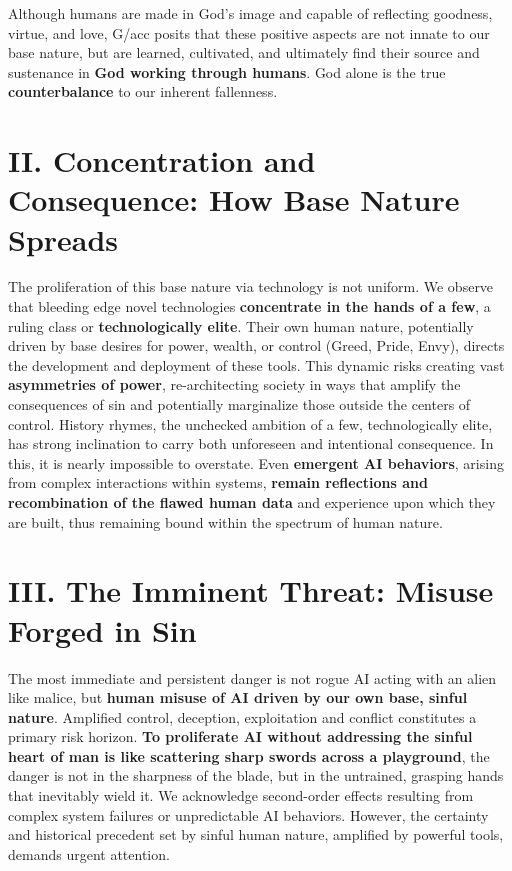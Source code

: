 \documentclass[11pt]{article}
\begin{document}
Although humans are made in God's image and capable of reflecting goodness, virtue, and love, G/acc posits that these positive aspects are not innate to our base nature, but are learned, cultivated, and ultimately find their source and sustenance in \textbf{God working through humans}. God alone is the true\textbf{ counterbalance} to our inherent fallenness.

\section*{II. Concentration and Consequence: How Base Nature Spreads}

The proliferation of this base nature via technology is not uniform. We observe that bleeding edge novel technologies \textbf{concentrate in the hands of a few}, a ruling class or \textbf{technologically elite}. Their own human nature, potentially driven by base desires for power, wealth, or control (Greed, Pride, Envy), directs the development and deployment of these tools. This dynamic risks creating vast \textbf{asymmetries of power}, re-architecting society in ways that amplify the consequences of sin and potentially marginalize those outside the centers of control. History rhymes, the unchecked ambition of a few, technologically elite, has strong inclination to carry both unforeseen and intentional consequence. In this, it is nearly impossible to overstate. Even \textbf{emergent AI behaviors}, arising from complex interactions within systems, \textbf{remain reflections and recombination of the flawed human data} and experience upon which they are built, thus remaining bound within the spectrum of human nature.

\section*{III. The Imminent Threat: Misuse Forged in Sin}

The most immediate and persistent danger is not rogue AI acting with an alien like malice, but \textbf{human misuse of AI driven by our own base, sinful nature}. Amplified control, deception, exploitation and conflict constitutes a primary risk horizon. \textbf{To proliferate AI without addressing the sinful heart of man is like scattering sharp swords across a playground}, the danger is not in the sharpness of the blade, but in the untrained, grasping hands that inevitably wield it. We acknowledge second-order effects resulting from complex system failures or unpredictable AI behaviors. However, the certainty and historical precedent set by sinful human nature, amplified by powerful tools, demands urgent attention.
\end{document}
